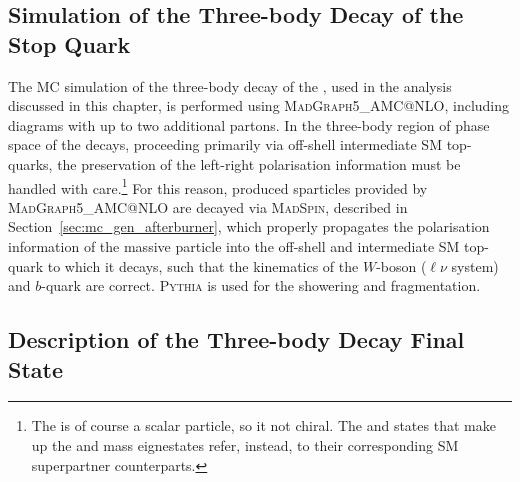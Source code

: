 \subsection{Simulation of the Three-body Decay of the Stop Quark}
\label{sec:stop_sim}

The MC simulation of the three-body decay of the \stopone, used in the analysis discussed in 
this chapter, is performed using \textsc{MadGraph5\_AMC@NLO}, including diagrams with up to
two additional partons.
In the three-body region of phase space of the \stopone decays, proceeding primarily via off-shell
intermediate SM top-quarks, the preservation of the \stopone left-right polarisation information
must be handled with care.\footnote{The
\stopone is of course a scalar particle, so it not chiral.
The \stopL and \stopR  states that make up the \stopone and \stoptwo mass eignestates refer, instead, 
to their corresponding SM superpartner counterparts.
}
For this reason, produced \stop sparticles provided by \textsc{MadGraph5\_AMC@NLO} are decayed
via \textsc{MadSpin}, described in Section~\ref{sec:mc_gen_afterburner}, which properly
propagates the polarisation information of the massive \stopone particle into the
off-shell and intermediate SM top-quark to which it decays, such that the kinematics of the
$W$-boson ($\ell \nu$ system) and $b$-quark are correct.
\textsc{Pythia} is used for the showering and fragmentation.

\subsection{Description of the Three-body Decay Final State}
\label{sec:stop_final_state}

